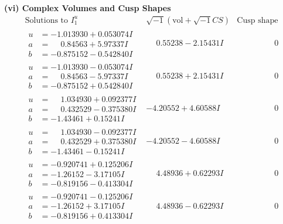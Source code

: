 \documentclass[1p]{elsarticle_modified}
\theoremstyle{definition}
\newcommand{\I}{\sqrt{-1}}
\begin{document}
\newpage\flushleft \textbf{(vi) Complex Volumes and Cusp Shapes}
$$\begin{array}{c|c|c}  
\text{Solutions to }I^u_{1}& \I (\text{vol} + \sqrt{-1}CS) & \text{Cusp shape}\\
 \hline 
\begin{aligned}
u &= -1.013930 + 0.053074 I \\
a &= \phantom{-}0.84563 + 5.97337 I \\
b &= -0.875152 - 0.542840 I\end{aligned}
 & \phantom{-}0.55238 - 2.15431 I & \phantom{-0.000000 } 0 \\ \hline\begin{aligned}
u &= -1.013930 - 0.053074 I \\
a &= \phantom{-}0.84563 - 5.97337 I \\
b &= -0.875152 + 0.542840 I\end{aligned}
 & \phantom{-}0.55238 + 2.15431 I & \phantom{-0.000000 } 0 \\ \hline\begin{aligned}
u &= \phantom{-}1.034930 + 0.092377 I \\
a &= \phantom{-}0.432529 - 0.375380 I \\
b &= -1.43461 + 0.15241 I\end{aligned}
 & -4.20552 + 4.60588 I & \phantom{-0.000000 } 0 \\ \hline\begin{aligned}
u &= \phantom{-}1.034930 - 0.092377 I \\
a &= \phantom{-}0.432529 + 0.375380 I \\
b &= -1.43461 - 0.15241 I\end{aligned}
 & -4.20552 - 4.60588 I & \phantom{-0.000000 } 0 \\ \hline\begin{aligned}
u &= -0.920741 + 0.125206 I \\
a &= -1.26152 - 3.17105 I \\
b &= -0.819156 - 0.413304 I\end{aligned}
 & \phantom{-}4.48936 + 0.62293 I & \phantom{-0.000000 } 0 \\ \hline\begin{aligned}
u &= -0.920741 - 0.125206 I \\
a &= -1.26152 + 3.17105 I \\
b &= -0.819156 + 0.413304 I\end{aligned}
 & \phantom{-}4.48936 - 0.62293 I & \phantom{-0.000000 } 0 \\ \hline\begin{aligned}

\end{aligned}
\end{array}$$
\end{document}
